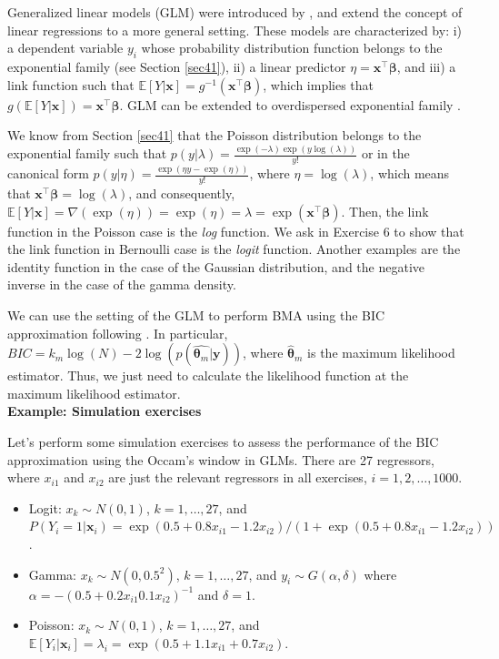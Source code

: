 Generalized linear models (GLM) were introduced by \cite{nelder1972generalized}, and extend the concept of linear regressions to a more general setting. These models are characterized by: i) a dependent variable ${y}_i$ whose probability distribution function belongs to the exponential family (see Section \ref{sec41}), ii) a linear predictor $\eta=\bm{x}^{\top}\bm{\beta}$, and iii) a link function such that $\mathbb{E}[Y|\bm{x}]=g^{-1}(\bm{x}^{\top}\bm{\beta})$, which implies that $g(\mathbb{E}[Y|\bm{x}])=\bm{x}^{\top}\bm{\beta}$. GLM can be extended to overdispersed exponential family \cite{McCullagh1989}.

We know from Section \ref{sec41} that the Poisson distribution belongs to the exponential family such that $p(y|\lambda)=\frac{\exp(-\lambda)\exp(y\log(\lambda))}{y!}$ or in the canonical form $p(y|\eta)=\frac{\exp(\eta y-\exp(\eta))}{y!}$, where $\eta=\log(\lambda)$, which means that $\bm{x}^{\top}\bm{\beta}=\log(\lambda)$, and consequently, $\mathbb{E}[Y|\bm{x}]=\nabla(\exp(\eta))=\exp(\eta)=\lambda=\exp(\bm{x}^{\top}\bm{\beta})$. Then, the link function in the Poisson case is the \textit{log} function. We ask in Exercise 6 to show that the link function in Bernoulli case is the \textit{logit} function. Another examples are the identity function in the case of the Gaussian distribution, and the negative inverse in the case of the gamma density.

We can use the setting of the GLM to perform BMA using the BIC approximation following \cite{Raftery1995}. In particular, $BIC=k_m\log(N)-2\log(p(\hat{\bm{\theta}_m}|\bm{y}))$, where $\hat{\bm{\theta}}_m$ is the maximum likelihood estimator. Thus, we just need to calculate the likelihood function at the maximum likelihood estimator.\\

\textbf{Example: Simulation exercises}

Let's perform some simulation exercises to assess the performance of the BIC approximation using the Occam's window in GLMs. There are 27 regressors, where $x_{i1}$ and $x_{i2}$ are just the relevant regressors in all exercises, $i=1,2,\dots,1000$.
\begin{itemize}
	\item Logit: $x_k\sim N(0, 1)$, $k =1,\dots,27$, and $P(Y_i=1|\bm{x}_i)=\exp(0.5+0.8x_{i1}-1.2x_{i2})/(1+\exp(0.5+0.8x_{i1}-1.2x_{i2}))$.
	
	\item Gamma: $x_k\sim N(0, 0.5^2)$, $k =1,\dots,27$, and $y_i\sim G(\alpha,\delta)$ where $\alpha=-(0.5+0.2x_{i1}0.1x_{i2})^{-1}$ and $\delta=1$.
	
	\item Poisson: $x_k\sim N(0, 1)$, $k =1,\dots,27$, and $\mathbb{E}[Y_i|\bm{x}_i]=\lambda_i=\exp(0.5+1.1x_{i1}+0.7x_{i2})$.   
\end{itemize}

